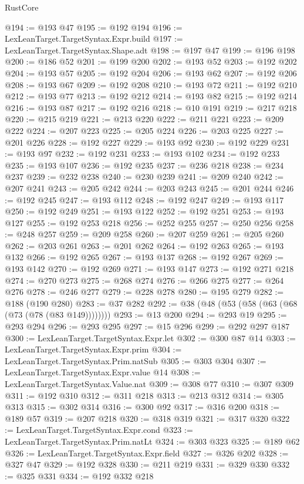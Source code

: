 \begin{lexlean}{RustCore}
\begin{coremodule}
@194 := @193 @47
@195 := @192 @194
@196 := LexLeanTarget.TargetSyntax.Expr.build
@197 := LexLeanTarget.TargetSyntax.Shape.adt
@198 := @197 @47
@199 := @196 @198
@200 := @186 @52
@201 := @199 @200
@202 := @193 @52
@203 := @192 @202
@204 := @193 @57
@205 := @192 @204
@206 := @193 @62
@207 := @192 @206
@208 := @193 @67
@209 := @192 @208
@210 := @193 @72
@211 := @192 @210
@212 := @193 @77
@213 := @192 @212
@214 := @193 @82
@215 := @192 @214
@216 := @193 @87
@217 := @192 @216
@218 := @10 @191
@219 := @217 @218
@220 := @215 @219
@221 := @213 @220
@222 := @211 @221
@223 := @209 @222
@224 := @207 @223
@225 := @205 @224
@226 := @203 @225
@227 := @201 @226
@228 := @192 @227
@229 := @193 @92
@230 := @192 @229
@231 := @193 @97
@232 := @192 @231
@233 := @193 @102
@234 := @192 @233
@235 := @193 @107
@236 := @192 @235
@237 := @236 @218
@238 := @234 @237
@239 := @232 @238
@240 := @230 @239
@241 := @209 @240
@242 := @207 @241
@243 := @205 @242
@244 := @203 @243
@245 := @201 @244
@246 := @192 @245
@247 := @193 @112
@248 := @192 @247
@249 := @193 @117
@250 := @192 @249
@251 := @193 @122
@252 := @192 @251
@253 := @193 @127
@255 := @192 @253 @218
@256 := @252 @255
@257 := @250 @256
@258 := @248 @257
@259 := @209 @258
@260 := @207 @259
@261 := @205 @260
@262 := @203 @261
@263 := @201 @262
@264 := @192 @263
@265 := @193 @132
@266 := @192 @265
@267 := @193 @137
@268 := @192 @267
@269 := @193 @142
@270 := @192 @269
@271 := @193 @147
@273 := @192 @271 @218
@274 := @270 @273
@275 := @268 @274
@276 := @266 @275
@277 := @264 @276
@278 := @246 @277
@279 := @228 @278
@280 := @195 @279
@282 := @188 (@190 @280)
@283 := @37 @282
@292 := @38 (@48 (@53 (@58 (@63 (@68 (@73 (@78 (@83 @149))))))))
@293 := @13 @200
@294 := @293 @19
@295 := @293 @294
@296 := @293 @295
@297 := @15 @296
@299 := @292 @297 @187
@300 := LexLeanTarget.TargetSyntax.Expr.let
@302 := @300 @87 @14
@303 := LexLeanTarget.TargetSyntax.Expr.prim
@304 := LexLeanTarget.TargetSyntax.Prim.natSub
@305 := @303 @304
@307 := LexLeanTarget.TargetSyntax.Expr.value @14
@308 := LexLeanTarget.TargetSyntax.Value.nat
@309 := @308 @77
@310 := @307 @309
@311 := @192 @310
@312 := @311 @218
@313 := @213 @312
@314 := @305 @313
@315 := @302 @314
@316 := @300 @92
@317 := @316 @200
@318 := @189 @57
@319 := @207 @218
@320 := @318 @319
@321 := @317 @320
@322 := LexLeanTarget.TargetSyntax.Expr.cond
@323 := LexLeanTarget.TargetSyntax.Prim.natLt
@324 := @303 @323
@325 := @189 @62
@326 := LexLeanTarget.TargetSyntax.Expr.field
@327 := @326 @202
@328 := @327 @47
@329 := @192 @328
@330 := @211 @219
@331 := @329 @330
@332 := @325 @331
@334 := @192 @332 @218

\end{coremodule}
\end{lexlean}

